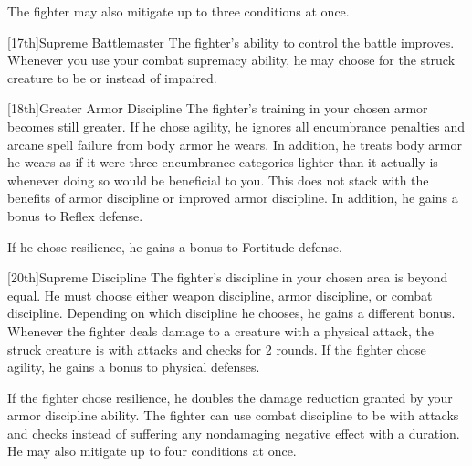         \par The fighter may also mitigate up to three conditions at once.

        [17th]{Supreme Battlemaster}
        The fighter's ability to control the battle improves.
        Whenever you use your combat supremacy ability, he may choose for the struck creature to be \taunted or \frightened instead of impaired.

        [18th]{Greater Armor Discipline}
        The fighter's training in your chosen armor becomes still greater.
        If he chose agility, he ignores all encumbrance penalties and arcane spell failure from body armor he wears.
        In addition, he treats body armor he wears as if it were three encumbrance categories lighter than it actually is whenever doing so would be beneficial to you.
        This does not stack with the benefits of armor discipline or improved armor discipline.
        In addition, he gains a  bonus to Reflex defense.

        If he chose resilience, he gains a  bonus to Fortitude defense.

        [20th]{Supreme Discipline}
        The fighter's discipline in your chosen area is beyond equal.
        He must choose either weapon discipline, armor discipline, or combat discipline.
        Depending on which discipline he chooses, he gains a different bonus.
        Whenever the fighter deals damage to a creature with a physical attack, the struck creature is \severelyimpaired with attacks and checks for 2 rounds.
        If the fighter chose agility, he gains a  bonus to physical defenses.

        If the fighter chose resilience, he doubles the damage reduction granted by your armor discipline ability.
        The fighter can use combat discipline to be \impaired with attacks and checks instead of suffering any nondamaging negative effect with a duration.
        He may also mitigate up to four conditions at once.


